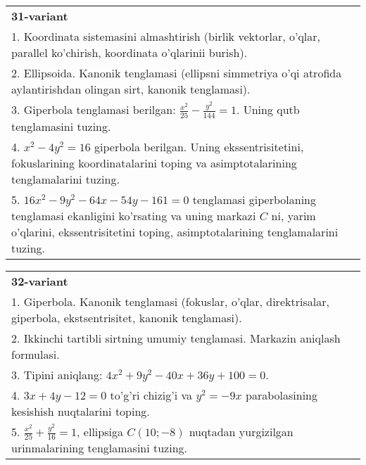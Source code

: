 \documentclass{article}
\begin{document}
\begin{tabular}{m{17cm}}
\textbf{31-variant}\\
1. Koordinata sistemasini almashtirish (birlik vektorlar, o'qlar, parallel ko'chirish, koordinata o'qlarinii burish).\\

2. Ellipsoida. Kanonik tenglamasi (ellipsni simmetriya o'qi atrofida aylantirishdan olingan sirt, kanonik tenglamasi).\\

3. Giperbola tenglamasi berilgan: $\frac{x^{2}}{25}-\frac{y^{2}}{144}=1$. Uning qutb tenglamasini tuzing.\\

4. $x^{2} - 4y^{2} = 16$ giperbola berilgan. Uning ekssentrisitetini, fokuslarining koordinatalarini toping va asimptotalarining tenglamalarini tuzing.\\

5. $16x^{2} - 9y^{2} - 64x - 54y - 161 = 0$ tenglamasi giperbolaning tenglamasi ekanligini ko'rsating va uning markazi $C$ ni, yarim o'qlarini, ekssentrisitetini toping, asimptotalarining tenglamalarini tuzing.  
\end{tabular}
\vspace{1cm}


\begin{tabular}{m{17cm}}
\textbf{32-variant}\\
1. Giperbola. Kanonik tenglamasi (fokuslar, o'qlar, direktrisalar, giperbola, ekstsentrisitet, kanonik tenglamasi).\\

2. Ikkinchi tartibli sirtning umumiy tenglamasi. Markazin aniqlash formulasi.\\

3. Tipini aniqlang: $4x^2+9y^2-40x+36y+100=0$.\\

4. $3x + 4y - 12 = 0$ to'g'ri chizig'i va $y^{2} = - 9x$ parabolasining kesishish nuqtalarini toping.\\

5. $\frac{x^{2}}{25} + \frac{y^{2}}{16} = 1$, ellipsiga $C(10; - 8)$ nuqtadan yurgizilgan urinmalarining tenglamasini tuzing.  
\end{tabular}
\vspace{1cm}
\end{document}
